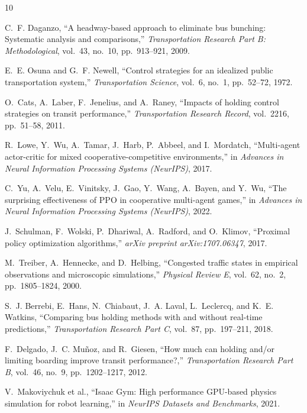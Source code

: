 \documentclass[conference]{IEEEtran}
\begin{document}

% 
% 
% 
% 
% 
% 


\begin{thebibliography}{10}

C.~F. Daganzo, ``A headway-based approach to eliminate bus bunching: Systematic analysis and comparisons,'' \textit{Transportation Research Part B: Methodological}, vol.~43, no.~10, pp.~913--921, 2009.

E.~E. Osuna and G.~F. Newell, ``Control strategies for an idealized public transportation system,'' \textit{Transportation Science}, vol.~6, no.~1, pp.~52--72, 1972.

O.~Cats, A.~Laber, F.~Jenelius, and A.~Raney, ``Impacts of holding control strategies on transit performance,'' \textit{Transportation Research Record}, vol.~2216, pp.~51--58, 2011.

R.~Lowe, Y.~Wu, A.~Tamar, J.~Harb, P.~Abbeel, and I.~Mordatch, ``Multi-agent actor-critic for mixed cooperative-competitive environments,'' in \textit{Advances in Neural Information Processing Systems (NeurIPS)}, 2017.

C.~Yu, A.~Velu, E.~Vinitsky, J.~Gao, Y.~Wang, A.~Bayen, and Y.~Wu, ``The surprising effectiveness of PPO in cooperative multi-agent games,'' in \textit{Advances in Neural Information Processing Systems (NeurIPS)}, 2022.

J.~Schulman, F.~Wolski, P.~Dhariwal, A.~Radford, and O.~Klimov, ``Proximal policy optimization algorithms,'' \textit{arXiv preprint arXiv:1707.06347}, 2017.

M.~Treiber, A.~Hennecke, and D.~Helbing, ``Congested traffic states in empirical observations and microscopic simulations,'' \textit{Physical Review E}, vol.~62, no.~2, pp.~1805--1824, 2000.

S.~J. Berrebi, E.~Hans, N.~Chiabaut, J.~A. Laval, L.~Leclercq, and K.~E. Watkins, ``Comparing bus holding methods with and without real-time predictions,'' \textit{Transportation Research Part C}, vol.~87, pp.~197--211, 2018.

F.~Delgado, J.~C. Mu\~noz, and R.~Giesen, ``How much can holding and/or limiting boarding improve transit performance?,'' \textit{Transportation Research Part B}, vol.~46, no.~9, pp.~1202--1217, 2012.

V.~Makoviychuk et al., ``Isaac Gym: High performance GPU-based physics simulation for robot learning,'' in \textit{NeurIPS Datasets and Benchmarks}, 2021.

\end{thebibliography}
\end{document}
